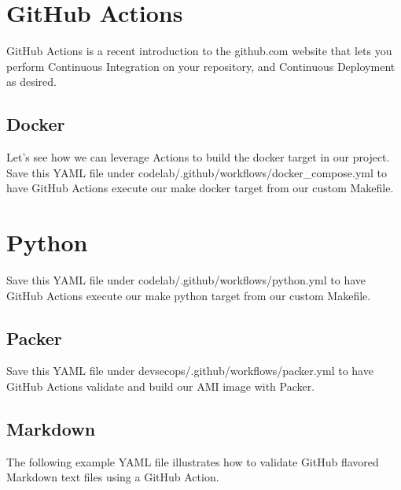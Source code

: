 \section{GitHub Actions}

\justifying
GitHub Actions is a recent introduction to the github.com website that
lets you perform Continuous Integration on your repository, and Continuous
Deployment as desired.

\subsection{Docker}
\justifying
Let's see how we can leverage Actions to build the docker target in our
project. Save this YAML file under
codelab/.github/workflows/docker\_compose.yml to have GitHub Actions
execute our make docker target from our custom Makefile.

%	


\section{Python}
\justifying
Save this YAML file under codelab/.github/workflows/python.yml to have
GitHub Actions execute our make python target from our custom Makefile.

%	

\subsection{Packer}
\justifying
Save this YAML file under devsecops/.github/workflows/packer.yml to have
GitHub Actions validate and build our AMI image with Packer.

%	

\subsection{Markdown}
\justifying
The following example YAML file illustrates how to validate GitHub
flavored Markdown text files using a GitHub Action.

